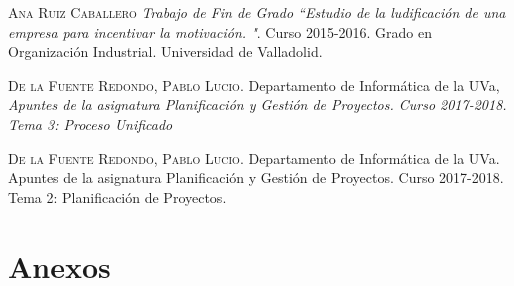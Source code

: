\documentclass[twoside]{report}
\begin{document}
\begin{thebibliography}{a}
 \textsc{Ana Ruiz Caballero} \textit{Trabajo de Fin de Grado “Estudio de la ludificación de una empresa para incentivar la motivación. "}. Curso 2015-2016. Grado en Organización Industrial. Universidad de Valladolid. 

 \textsc{De la Fuente Redondo, Pablo Lucio}. Departamento de Informática de la UVa, \textit{Apuntes de la asignatura Planificación y Gestión de Proyectos. Curso 2017-2018. Tema 3: Proceso Unificado}

 \textsc{De la Fuente Redondo, Pablo Lucio}. Departamento de Informática de la UVa. Apuntes de la asignatura Planificación y Gestión de Proyectos. Curso 2017-2018. Tema 2: Planificación de Proyectos.


\end{thebibliography}

\chapter{Anexos}
\end{document}
